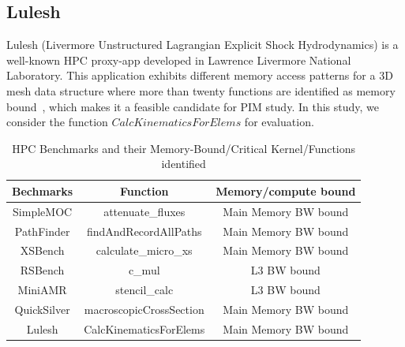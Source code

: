 \subsection{Lulesh}
Lulesh (Livermore Unstructured Lagrangian Explicit Shock Hydrodynamics) is a well-known HPC proxy-app developed in Lawrence Livermore National Laboratory. This application exhibits different memory access patterns for a 3D mesh data structure where more than twenty functions are identified as memory bound~\cite{monil2022mapredict}, which makes it a feasible candidate for PIM study. In this study, we consider the function $CalcKinematicsForElems$ for evaluation.




%
%
\begin{table}[t]
\small
\caption{HPC Benchmarks and their Memory-Bound/Critical Kernel/Functions identified}
\centering
    \begin{tabularx}{\columnwidth}{ccc}
\toprule
    Bechmarks & Function & Memory/compute bound \\
\midrule

SimpleMOC & attenuate\_fluxes & Main Memory BW bound \\
PathFinder   & findAndRecordAllPaths & Main Memory BW bound \\
XSBench      & calculate\_micro\_xs & Main Memory BW bound \\
RSBench      & c\_mul & L3 BW bound \\
MiniAMR      & stencil\_calc & L3 BW bound \\
QuickSilver      & macroscopicCrossSection & Main Memory BW bound \\
Lulesh & CalcKinematicsForElems & Main Memory BW bound \\
\bottomrule
   \end{tabularx}
\label{table:apps}
\end{table}
%
%
%



